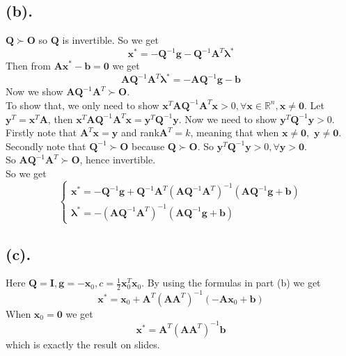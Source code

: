 \documentclass[12pt,letterpaper]{article}
\begin{document}
\subsection*{(b).}
$\boldsymbol{Q}\succ\boldsymbol{O}$ so $\boldsymbol{Q}$ is invertible. So we get $$\boldsymbol{x}^*=-\boldsymbol{Q}^{-1}\boldsymbol{g}-\boldsymbol{Q}^{-1}\boldsymbol{A}^T\boldsymbol{\lambda}^*$$
Then from $\boldsymbol{Ax}^*-\boldsymbol{b}=\boldsymbol{0}$ we get
$$\boldsymbol{AQ}^{-1}\boldsymbol{A}^T\boldsymbol{\lambda}^*=-\boldsymbol{AQ}^{-1}\boldsymbol{g}-\boldsymbol{b}$$
Now we show $\boldsymbol{AQ}^{-1}\boldsymbol{A}^T\succ\boldsymbol{O}$.\\
To show that, we only need to show $\boldsymbol{x}^T\boldsymbol{AQ}^{-1}\boldsymbol{A}^T\boldsymbol{x}>0, \forall \boldsymbol{x}\in\mathbb{R}^n,\boldsymbol{x}\neq\boldsymbol{0}$.
Let $\boldsymbol{y}^T=\boldsymbol{x}^T\boldsymbol{A}$, then $\boldsymbol{x}^T\boldsymbol{AQ}^{-1}\boldsymbol{A}^T\boldsymbol{x}=\boldsymbol{y}^T\boldsymbol{Q}^{-1}\boldsymbol{y}$. Now we need to show $\boldsymbol{y}^T\boldsymbol{Q}^{-1}\boldsymbol{y}>0$.\\
Firstly note that $\boldsymbol{A}^T\boldsymbol{x}=\boldsymbol{y}$ and rank$\boldsymbol{A}^T=k$, meaning that when $\boldsymbol{x}\neq\boldsymbol{0},$ $\boldsymbol{y}\neq\boldsymbol{0}$. \\
Secondly note that $\boldsymbol{Q}^{-1}\succ\boldsymbol{O}$ because $\boldsymbol{Q}\succ\boldsymbol{O}$. So $\boldsymbol{y}^T\boldsymbol{Q}^{-1}\boldsymbol{y}>0, \forall\boldsymbol{y}>\boldsymbol{0}$.\\
So $\boldsymbol{AQ}^{-1}\boldsymbol{A}^T\succ\boldsymbol{O}$, hence invertible.\\
So we get 
$$\begin{cases}
\boldsymbol{x}^*=-\boldsymbol{Q}^{-1}\boldsymbol{g}+\boldsymbol{Q}^{-1}\boldsymbol{A}^T(\boldsymbol{AQ}^{-1}\boldsymbol{A}^T)^{-1}(\boldsymbol{AQ}^{-1}\boldsymbol{g}+\boldsymbol{b})\\
\boldsymbol{\lambda}^*=-(\boldsymbol{AQ}^{-1}\boldsymbol{A}^T)^{-1}(\boldsymbol{AQ}^{-1}\boldsymbol{g}+\boldsymbol{b})
\end{cases}$$
\subsection*{(c).}
Here $\boldsymbol{Q}=\boldsymbol{I},\boldsymbol{g}=-\boldsymbol{x}_0,c=\frac{1}{2}\boldsymbol{x}_0^T\boldsymbol{x}_0$. By using the formulas in part (b) we get $$\boldsymbol{x}^*=\boldsymbol{x}_0+\boldsymbol{A}^T(\boldsymbol{AA}^T)^{-1}(-\boldsymbol{Ax}_0+\boldsymbol{b})$$
When $\boldsymbol{x}_0=\boldsymbol{0}$ we get $$\boldsymbol{x}^*=\boldsymbol{A}^T(\boldsymbol{AA}^T)^{-1}\boldsymbol{b}$$
which is exactly the result on slides.
\end{document}

